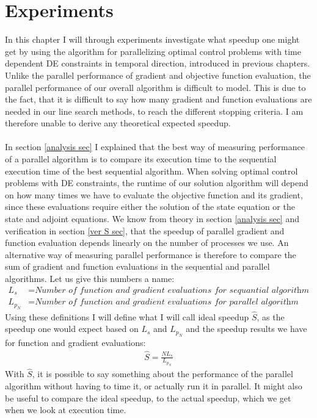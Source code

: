 \chapter{Experiments}\label{Experiments chapter}
In this chapter I will through experiments investigate what speedup one might get by using the algorithm for parallelizing optimal control problems with  time dependent DE constraints in temporal direction, introduced in previous chapters. Unlike the parallel performance of gradient and objective function evaluation, the parallel performance of our overall algorithm is difficult to model. This is due to the fact, that it is difficult to say how many gradient and function evaluations are needed in our line search methods, to reach the different stopping criteria. I am therefore unable to derive any theoretical expected speedup.
\\
\\
In section \ref{analysis sec} I explained that the best way of measuring performance of a parallel algorithm is to compare its execution time to the sequential execution time of the best sequential algorithm. When solving optimal control problems with DE constraints, the runtime of our solution algorithm will depend on how many times we have to evaluate the objective function and its gradient, since these evaluations require either the solution of the state equation or the state and adjoint equations. We know from theory in section \ref{analysis sec} and verification in section \ref{ver S sec}, that the speedup of parallel gradient and function evaluation depends linearly on the number of processes we use. An alternative way of measuring parallel performance is therefore to compare the sum of gradient and function evaluations in the sequential and parallel algorithms. Let us give this numbers a name:
\begin{align*}
L_s &= \textit{Number of function and gradient evaluations for sequantial algorithm}\\
L_{p_N} &= \textit{Number of function and gradient evaluations for parallel algorithm using N processes}
\end{align*} 
Using these definitions I will define what I will call ideal speedup $\hat{S}$, as the speedup one would expect based on $L_s$ and $L_{p_N}$ and the speedup results we have for function and gradient evaluations:
\begin{align}
\hat S = \frac{NL_s}{L_{p_N}} \label{ideal S}
\end{align}
With $\hat S$, it is possible to say something about the performance of the parallel algorithm without having to time it, or actually run it in parallel. It might also be useful to compare the ideal speedup, to the actual speedup, which we get when we look at execution time.
